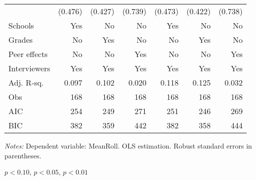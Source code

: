 \begin{table}[htbp]
\begin{adjustbox}{width=1\textwidth}
\begin{threeparttable}
\begin{tabular}{l*{6}{D{.}{.}{-1}}}
                    &             (0.476)   &             (0.427)   &             (0.739)   &             (0.473)   &             (0.422)   &             (0.738)   \\
Schools             &                 Yes   &                  No   &                  No   &                 Yes   &                  No   &                  No   \\
Grades              &                  No   &                 Yes   &                  No   &                  No   &                 Yes   &                  No   \\
Peer effects        &                  No   &                  No   &                 Yes   &                  No   &                  No   &                 Yes   \\
Interviewers        &                 Yes   &                 Yes   &                 Yes   &                 Yes   &                 Yes   &                 Yes   \\
\midrule
Adj. R-sq.          &               0.097   &               0.102   &               0.020   &               0.118   &               0.125   &               0.032   \\
Obs                 &                 168   &                 168   &                 168   &                 168   &                 168   &                 168   \\
AIC                 &                 254   &                 249   &                 271   &                 251   &                 246   &                 269   \\
BIC                 &                 382   &                 359   &                 442   &                 382   &                 358   &                 444   \\
\bottomrule
\end{tabular}
\begin{tablenotes}
\footnotesize
\item \textit{Notes:} Dependent variable: MeanRoll. OLS estimation. Robust standard errors in parentheses.
\item \sym{*} \(p<0.10\), \sym{**} \(p<0.05\), \sym{***} \(p<0.01\)
\end{tablenotes}
\end{threeparttable}
\end{adjustbox}
\label{tab:cheat_math}
\end{table}